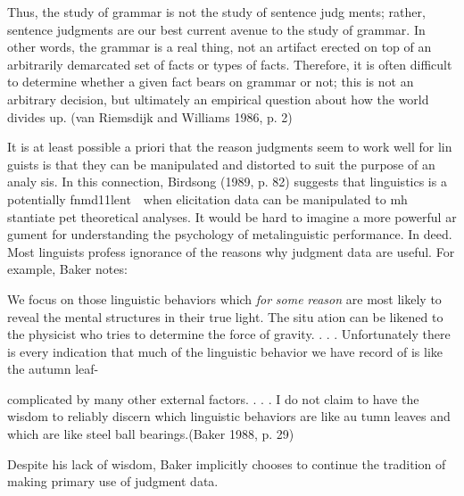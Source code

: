 \begin{styleTextbody}
Thus, the study of grammar is not the study of sentence judg\- ments; rather, sentence judgments are our best current avenue to the study of grammar. In other words, the grammar is a real thing, not an artifact erected on top of an arbitrarily demarcated set of facts or types of facts. Therefore, it is often difficult to determine whether a given fact bears on grammar or not; this is not an arbitrary decision, but ultimately an empirical question about how the world divides up.{\textquotedbl} (van Riemsdijk and Williams 1986, p. 2)
\end{styleTextbody}


\begin{styleStandard}
It is at least possible a priori that the reason judgments seem to work well for lin\- guists is that they can be manipulated and distorted to suit the purpose of an analy\- sis. In this connection, Birdsong (1989, p. 82) suggests that {\textquotedbl}linguistics is a potentially fnmd11lent\ \ when elicitation data can be manipulated to mh\- stantiate pet theoretical analyses. It would be hard to imagine a more powerful ar\- gument for understanding the psychology of metalinguistic performance.{\textquotedbl} In\- deed. Most linguists profess ignorance of the reasons why judgment data are useful. For example, Baker notes:
\end{styleStandard}


\begin{styleTextbody}
We focus on those linguistic behaviors which \textit{for}\textit{ }\textit{some}\textit{ }\textit{reason}\textit{ }are most likely to reveal the mental structures in their true light. The situ\- ation can be likened to the physicist who tries to determine the force of gravity. . . . Unfortunately there is every indication that much of the linguistic behavior we have record of is like the autumn leaf-
\end{styleTextbody}


\clearpage\setcounter{page}{1}\begin{styleTextbody}
complicated by many other external factors. . . . I do not claim to have the wisdom to reliably discern which linguistic behaviors are like au\- tumn leaves and which are like steel ball bearings.{\textquotedbl}(Baker 1988, p. 29)
\end{styleTextbody}


\begin{styleTextbody}
Despite his lack of {\textquotedbl}wisdom,{\textquotedbl} Baker implicitly chooses to continue the tradition of making primary use of judgment data.
\end{styleTextbody}


